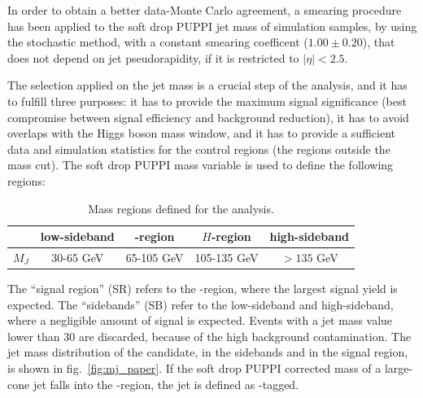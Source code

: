 
\noindent In order to obtain a better data-Monte Carlo agreement, a smearing procedure has been applied to the soft drop PUPPI jet mass of simulation samples, by using the stochastic method, with a constant smearing coefficent ($1.00 \pm 0.20$), that does not depend on jet pseudorapidity, if it is restricted to $|\eta|<2.5$.

\vspace*{1\baselineskip}

\noindent The selection applied on the jet mass is a crucial step of the analysis, and it has to fulfill three purposes: it has to provide the maximum signal significance (best compromise between signal efficiency and background reduction), it has to avoid overlaps with the Higgs boson mass window, and it has to provide a sufficient data and simulation statistics for the control regions (the regions outside the mass cut). The soft drop PUPPI mass variable is used to define the following regions:

\begin{table}[!htb]
  \begin{center}
\caption{Mass regions defined for the analysis.\label{tab:massregions}}
  \begin{tabular}{l|cccc}
  & low-sideband & \V-region & $H$-region & high-sideband \\
 \hline
 \hline
 $M_{J}$ & 30-65 GeV & 65-105 GeV & 105-135 GeV & $> 135$ GeV\\ 
 \end{tabular}
 \end{center}
 \label{tab:SR-SB}
\end{table}

\noindent The ``signal region'' (SR) refers to the \V-region, where the largest signal yield is expected. The ``sidebands'' (SB) refer to the low-sideband and high-sideband, where a negligible amount of signal is expected. Events with a jet mass value lower than 30 \GeV are discarded, because of the high background contamination. The jet mass distribution of the \V candidate, in the sidebands and in the signal region, is shown in fig.~\ref{fig:mj_paper}. If the soft drop PUPPI corrected mass of a large-cone jet falls into the \V-region, the jet is defined as \V-tagged.

